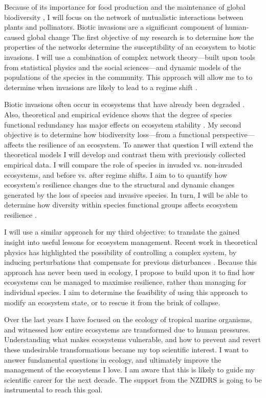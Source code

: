 \documentclass[a4paper]{report}
\begin{document}
Because of its importance for food production and the maintenance of global biodiversity \cite{Bascompte2006, Bascompte2007, Klein2007}, I will focus on the network of mutualistic interactions between plants and pollinators. 
Biotic invasions are a significant component of human-caused global change \cite{Vitousek1997}
The first objective of my research is to determine how the properties of the networks determine the susceptibility of an ecosystem to biotic invasions.
I will use a combination of complex network theory---built upon tools from statistical physics and the social sciences---and dynamic models of the populations of the species in the community\cite{Bastolla2009, Garcia-Algarra2013}. 
This approach will allow me to to determine when invasions are likely to lead to a regime shift \cite{Romanuk2009, Rohr2014, Tylianakis2014}. 

Biotic invasions often occur in ecosystems that have already been degraded \cite{Bennett2015}. 
Also, theoretical and empirical evidence shows that the degree of species functional redundancy has major effects on ecosystem stability \cite{Walker1999, Fonseca2001, Bellwood2003b, Loreau2004, Allison2008, Brandl2014a}. 
My second objective is to determine how biodiversity loss---from a functional perspective---affects the resilience of an ecosystem. 
To answer that question I will extend the theoretical models I will develop and contrast them with previously collected empirical data.
I will compare the role of species in invaded vs. non-invaded ecosystems, and before vs. after regime shifts.
I aim to to quantify how ecosystem's resilience changes due to the structural and dynamic changes generated by the loss of species and invasive species.
In turn, I will be able to determine how  diversity within species functional groups affects ecosystem resilience \cite{Rohr2014}.

I will use a similar approach for my third objective: to translate the gained insight into useful lessons for ecosystem management.
Recent work in theoretical physics has highlighted the possibility of controlling a complex system, by inducing perturbations that compensate for previous disturbances \cite{Cornelius2013}.
Because this approach has never been used in ecology, I propose to build upon it to find how ecosystems can be managed to maximise resilience, rather than managing for individual species.
I aim to determine the feasibility of using this approach to modify an ecosystem state, or to rescue it from the brink of collapse.

Over the last years I have focused on the ecology of tropical marine organisms, and witnessed how entire ecosystems are transformed due to human pressures.
Understanding what makes ecosystems vulnerable, and how to prevent and revert these undesirable transformations became my top scientific interest.
I want to answer fundamental questions in ecology, and ultimately improve the management of the ecosystems I love.
I am aware that this is likely to guide my scientific career for the next decade.
The support from the NZIDRS is going to be instrumental to reach this goal.
\end{document}

